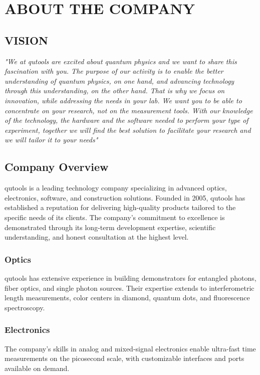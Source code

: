 \chapter{ABOUT THE COMPANY}
\label{ch:chapter02}

%
%
\section{VISION}

{\textit{"We at qutools are excited about quantum physics and we want to share this fascination with you. The purpose of our activity is to enable the better understanding of quantum physics, on one hand, and advancing technology through this understanding, on the other hand.
		That is why we focus on innovation, while addressing the needs in your lab. We want you to be able to concentrate on your research, not on the measurement tools. With our knowledge of the technology, the hardware and the software needed to perform your type of experiment, together we will find the best solution to facilitate your research and we will tailor it to your needs"}}


%
%
\section{Company Overview}
qutools is a leading technology company specializing in advanced optics, electronics, software, and construction solutions. Founded in 2005, qutools has established a reputation for delivering high-quality products tailored to the specific needs of its clients. The company's commitment to excellence is demonstrated through its long-term development expertise, scientific understanding, and honest consultation at the highest level.

\subsection{Optics}
qutools has extensive experience in building demonstrators for entangled photons, fiber optics, and single photon sources. Their expertise extends to interferometric length measurements, color centers in diamond, quantum dots, and fluorescence spectroscopy.

\subsection{Electronics}
\label{sec:chapter03:grafiken:subfloat}
The company’s skills in analog and mixed-signal electronics enable ultra-fast time measurements on the picosecond scale, with customizable interfaces and ports available on demand.

